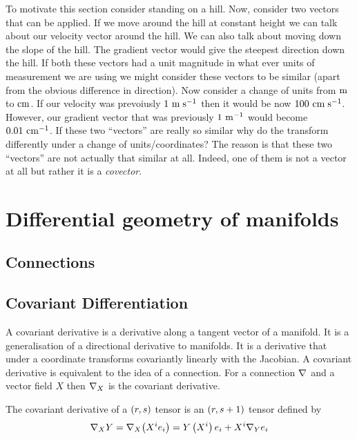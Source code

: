 To motivate this section consider standing on a hill. Now, consider two
vectors that can be applied. If we move around the hill at constant height we
can talk about our velocity vector around the hill. We can also talk about
moving down the slope of the hill. The gradient vector would give the steepest
direction down the hill. If both these vectors had a unit magnitude in what
ever units of measurement we are using we might consider these vectors to be
similar (apart from the obvious difference in direction). Now consider a
change of units \eg from $\mathrm{m}$ to $\mathrm{cm}$. If our velocity was prevoiusly
$ 1~\mathrm{\mathrm{m}\thickspace\mathrm{s}^{-1}} $ then it would be now $ 100~\mathrm{\mathrm{cm}\thickspace\mathrm{s}^{-1}} $. However, our
gradient vector that was previously $ 1~\mathrm{\mathrm{m}^{-1}} $ would become
$ 0.01~\mathrm{\mathrm{cm}^{-1}} $. If these two ``vectors'' are really so similar why do
the transform differently under a change of units/coordinates? The reason is
that these two ``vectors'' are not actually that similar at all. Indeed, one
of them is not a vector at all but rather it is a \emph{covector}.

\section{Differential geometry of manifolds}

\subsection{Connections}


\subsection{Covariant Differentiation}

A covariant derivative is a derivative along a tangent vector of a
manifold. It is a generalisation of a directional derivative to manifolds. It
is a derivative that under a coordinate transforms covariantly \ie linearly
with the Jacobian. A covariant derivative is equivalent to the idea of a
connection. For a connection $ \nabla_{}{} $ and a vector field $X$ then
$\covarderivop{X}{}$ is the covariant derivative. 

The covariant derivative of a $\left( r,s \right)$ tensor is an $\left( r,s+1 \right)$
tensor defined by
\begin{equation}
  \covarderivop{X}{Y}=\covarderivop{X}{\pbrac{X^{i}e_{i}}}=Y\pbrac{X^{i}}e_{i}+X^{i}\covarderivop{Y}e_{i}
\end{equation}

